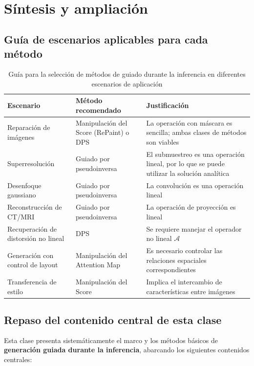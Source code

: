 \section{Síntesis y ampliación}

\subsection{Guía de escenarios aplicables para cada método}

\begin{table}[H]
\centering
\begin{tabular}{p{}p{}p{}}
\toprule
\textbf{Escenario} & \textbf{Método recomendado} & \textbf{Justificación} \\
\midrule
Reparación de imágenes & Manipulación del Score (RePaint) o DPS & La operación con máscara es sencilla; ambas clases de métodos son viables \\
Superresolución & Guiado por pseudoinversa & El submuestreo es una operación lineal, por lo que se puede utilizar la solución analítica \\
Desenfoque gaussiano & Guiado por pseudoinversa & La convolución es una operación lineal \\
Reconstrucción de CT/MRI & Guiado por pseudoinversa & La operación de proyección es lineal \\
Recuperación de distorsión no lineal & DPS & Se requiere manejar el operador no lineal $\mathcal{A}$ \\
Generación con control de layout & Manipulación del Attention Map & Es necesario controlar las relaciones espaciales correspondientes \\
Transferencia de estilo & Manipulación del Score & Implica el intercambio de características entre imágenes \\
\bottomrule
\end{tabular}
\caption{Guía para la selección de métodos de guiado durante la inferencia en diferentes escenarios de aplicación}
\end{table}

\subsection{Repaso del contenido central de esta clase}

Esta clase presenta sistemáticamente el marco y los métodos básicos de \textbf{generación guiada durante la inferencia}, abarcando los siguientes contenidos centrales:

